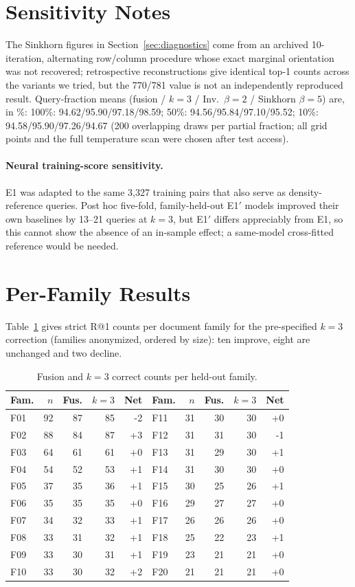 \section{Sensitivity Notes}\label{app:explore}
The Sinkhorn figures in Section~\ref{sec:diagnostics} come from an archived 10-iteration, alternating row/column procedure whose exact marginal orientation was not recovered; retrospective reconstructions give identical top-1 counts across the variants we tried, but the 770/781 value is not an independently reproduced result. Query-fraction means (fusion / $k=3$ / Inv.\ $\beta=2$ / Sinkhorn $\beta=5$) are, in \%: 100\%: 94.62/95.90/97.18/98.59; 50\%: 94.56/95.84/97.10/95.52; 10\%: 94.58/95.90/97.26/94.67 (200 overlapping draws per partial fraction; all grid points and the full temperature scan were chosen after test access).

\paragraph{Neural training-score sensitivity.} E1 was adapted to the same 3,327 training pairs that also serve as density-reference queries. Post hoc five-fold, family-held-out E1$'$ models improved their own baselines by 13--21 queries at $k=3$, but E1$'$ differs appreciably from E1, so this cannot show the absence of an in-sample effect; a same-model cross-fitted reference would be needed.

\section{Per-Family Results}\label{app:family}
Table~\ref{tab:family} gives strict R@1 counts per document family for the pre-specified $k=3$ correction (families anonymized, ordered by size): ten improve, eight are unchanged and two decline.
\begin{table}[h]
\centering\scriptsize
\caption{Fusion and $k=3$ correct counts per held-out family.}
\label{tab:family}
\begin{tabular}{lrrrr|lrrrr}
\toprule
Fam. & $n$ & Fus. & $k=3$ & Net & Fam. & $n$ & Fus. & $k=3$ & Net \\
\midrule
F01&92&87&85&-2 & F11&31&30&30&+0 \\
F02&88&84&87&+3 & F12&31&31&30&-1 \\
F03&64&61&61&+0 & F13&31&29&30&+1 \\
F04&54&52&53&+1 & F14&31&30&30&+0 \\
F05&37&35&36&+1 & F15&30&25&26&+1 \\
F06&35&35&35&+0 & F16&29&27&27&+0 \\
F07&34&32&33&+1 & F17&26&26&26&+0 \\
F08&33&31&32&+1 & F18&25&22&23&+1 \\
F09&33&30&31&+1 & F19&23&21&21&+0 \\
F10&33&30&32&+2 & F20&21&21&21&+0 \\
\bottomrule
\end{tabular}
\end{table}

